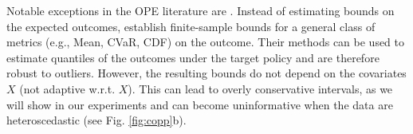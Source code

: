 Notable exceptions in the OPE literature are \cite{risk-assessment, chandak2021universal}. Instead of estimating bounds on the expected outcomes, \cite{risk-assessment, chandak2021universal} establish finite-sample bounds for a general class of metrics (e.g., Mean, CVaR, CDF) on the outcome. Their methods can be used to estimate quantiles of the outcomes under the target policy and are therefore robust to outliers. However, the resulting bounds do not depend on the covariates $X$ (not adaptive w.r.t. $X$). This can lead to overly conservative intervals, as we will show in our experiments and can become uninformative when the data are heteroscedastic (see Fig. \ref{fig:copp}b).




